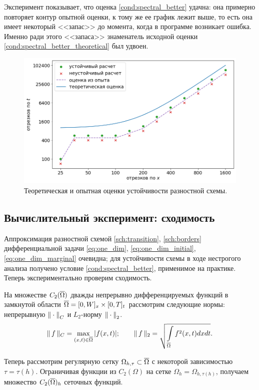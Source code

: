 Эксперимент показывает, что оценка \eqref{cond:spectral_better} удачна: она примерно повторяет контур опытной оценки, к тому же ее график лежит выше, то есть она имеет некоторый <<запас>> до момента, когда в программе возникает ошибка. Именно ради этого <<запаса>> знаменатель исходной оценки  \eqref{cond:spectral_better_theoretical} был удвоен.

\begin{figure}[!tp]
	\centering
	\includegraphics[width=\textwidth]{figures/stability_bounds.png}
	\vspace{-0.7cm}
	\caption{Теоретическая и опытная оценки устойчивости разностной схемы.}
	\label{fig:stability_bounds}
\end{figure}


\subsection{Вычислительный эксперимент: сходимость}

Аппроксимация разностной схемой \eqref{sch:transition}, \eqref{sch:borders} дифференциальной задачи \eqref{eq:one_dim}, \eqref{eq:one_dim_initial}, \eqref{eq:one_dim_marginal} очевидна; для устойчивости схемы в ходе нестрогого анализа получено условие \eqref{cond:spectral_better}, применимое на практике. Теперь экспериментально проверим сходимость.

На множестве $C_2({\overline{\Omega}})$ дважды непрерывно дифференцируемых функций в замкнутой области ${\overline{\Omega}} = [0, W]_x \times [0, T]_t$ рассмотрим следующие нормы: непрерывную ${\| \cdot \|}_C$ и $L_2$-норму ${\| \cdot \|}_2$.
$$\| \, f \, \|_C = \max \limits_{(x, t) \in {\overline{\Omega}}} |f(x, t)|; \qquad \| \, f \, \|_2 = \sqrt{\int \limits_{{\overline{\Omega}}} f^2(x, t) dx dt} {\text{.}}$$

Теперь рассмотрим регулярную сетку $\Omega_{h, \tau} \subset {\overline{\Omega}}$ с некоторой зависимостью $\tau = \tau(h)$. Ограничивая функции из $C_2(\Omega)$ на сетке $\Omega_h = \Omega_{h, \tau(h)}$, получаем множество $C_2({\overline{\Omega}})_h$ сеточных функций.

